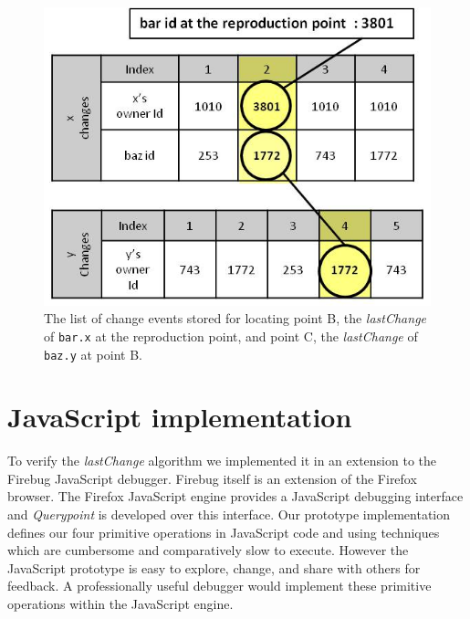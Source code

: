 \documentclass[runningheads,a4paper]{llncs}
\begin{document}
\begin{figure}[htp]
\centering 
\includegraphics[height=.3\textheight]{8-lastchange-lastchange.jpg}
\caption{The list of change events stored for locating point B, the
  \textit{lastChange} of \texttt{bar.x} at the reproduction point, and
  point C, the \textit{lastChange} of \texttt{baz.y} at point B.}
\label{fig:lastchange-lastchange}
\end{figure}



\section{JavaScript implementation}
To verify the \textit{lastChange} algorithm we
implemented it in an extension to the Firebug
JavaScript debugger\cite{Firebug}. %
Firebug itself is an extension of the Firefox browser\cite{Firefox}. %
The Firefox JavaScript engine provides a JavaScript debugging interface \cite{JSD} and 
\textit{Querypoint} is developed over this interface. Our prototype implementation defines our four primitive operations in JavaScript code and using techniques which are cumbersome and comparatively slow to execute. However the JavaScript prototype is
easy to explore, change, and share with others for feedback.
  A professionally useful debugger would implement these primitive operations within the JavaScript engine.
\end{document}
